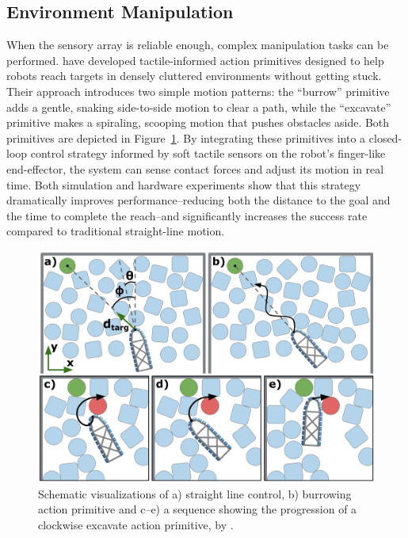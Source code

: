 \subsection{Environment Manipulation}
When the sensory array is reliable enough, complex manipulation tasks can be performed.
\textcite{Brouwer2024TactileInformedAP} have developed tactile-informed action primitives designed to help robots reach targets in densely cluttered environments without getting stuck.
Their approach introduces two simple motion patterns: the \enquote{burrow} primitive adds a gentle, snaking side-to-side motion to clear a path, while the \enquote{excavate} primitive makes a spiraling, scooping motion that pushes obstacles aside.
Both primitives are depicted in Figure~\ref{fig:environment-manipulation}.
By integrating these primitives into a closed-loop control strategy informed by soft tactile sensors on the robot's finger-like end-effector, the system can sense contact forces and adjust its motion in real time.
Both simulation and hardware experiments show that this strategy dramatically improves performance--reducing both the distance to the goal and the time to complete the reach--and significantly increases the success rate compared to traditional straight-line motion.

\begin{figure}[htb]
    \centering
    \includegraphics[width=\textwidth]{figures/environment-manipulation}
    \caption{Schematic visualizations of a) straight line control, b) burrowing action primitive and c--e) a sequence showing the progression of a clockwise excavate action primitive, by \textcite{Brouwer2024TactileInformedAP}.}
    \label{fig:environment-manipulation}
\end{figure}